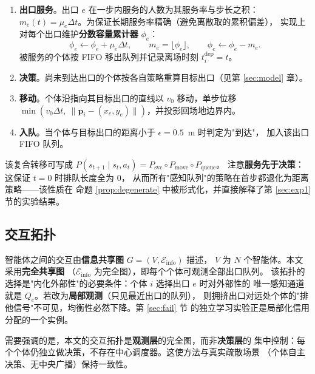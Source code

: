 \begin{enumerate}
  \item \textbf{出口服务}。出口 $e$ 在一步内服务的人数为其服务率与步长之积：
        $m_e(t)=\mu_e\Delta t$。为保证长期服务率精确（避免离散取的累积偏差），
        实现上对每个出口维护\textbf{分数容量累计器} $\phi_e$：
        \begin{equation}
          \phi_e \leftarrow \phi_e + \mu_e\Delta t,
          \qquad
          m_e=\lfloor \phi_e\rfloor,
          \qquad
          \phi_e \leftarrow \phi_e-m_e .
          \label{eq:frac}
        \end{equation}
        被服务的个体按 FIFO 移出队列并记录离场时刻 $t_i^{\text{dep}}=t$。
  \item \textbf{决策}。尚未到达出口的个体按各自策略重算目标出口（见第 \ref{sec:model} 章）。
  \item \textbf{移动}。个体沿指向其目标出口的直线以 $v_0$ 移动，单步位移
        $\min(v_0\Delta t,\ \|\mathbf p_i-(x_e,y_e)\|)$，并投影回场地边界内。
  \item \textbf{入队}。当个体与目标出口的距离小于 $\epsilon=0.5$~m 时判定为"到达"，
        加入该出口 FIFO 队列。
\end{enumerate}

该复合转移可写成
$P(s_{t+1}\mid s_t,a_t)=P_{\text{svc}}\circ P_{\text{move}}\circ P_{\text{queue}}$。
注意\textbf{服务先于决策}：这保证 $t=0$ 时排队长度全为 $0$，
从而所有"感知队列"的策略在首步都退化为距离策略——该性质在
命题 \ref{prop:degenerate} 中被形式化，并直接解释了第 \ref{sec:exp1} 节的实验结果。

\subsection{交互拓扑}
\label{sec:topology}

智能体之间的交互由\textbf{信息共享图} $G=(V,\mathcal E_{\text{info}})$ 描述，
$V$ 为 $N$ 个智能体。本文采用\textbf{完全共享图}
（$\mathcal E_{\text{info}}$ 为完全图），即每个个体可观测全部出口队列。
该拓扑的选择是"内化外部性"的必要条件：个体 $i$ 选择出口 $e$ 时对外部性的
唯一感知通道就是 $Q_e$。若改为\textbf{局部观测}（只见最近出口的队列），
则拥挤出口对远处个体的"排他信号"不可见，均衡性必然下降。第 \ref{sec:fail} 节
的独立学习实验正是局部化信用分配的一个实例。

需要强调的是，本文的交互拓扑是\textbf{观测层}的完全图，而非\textbf{决策层}的
集中控制：每个个体仍独立做决策，不存在中心调度器。这使方法与真实疏散场景
（个体自主决策、无中央广播）保持一致性。

